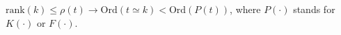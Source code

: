 $\text{rank}(k) \leq \rho(t) \rightarrow \text{Ord}(t \simeq k) < \text{Ord}(P(t))$,
where $P(\cdot)$ stands for $K(\cdot)$ or $F(\cdot)$.
